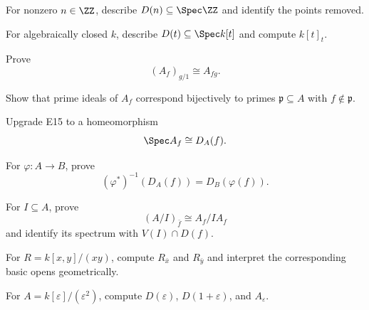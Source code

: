 \begin{exercise}
For nonzero $n\in\ZZ$, describe $D(n)\subseteq\Spec\ZZ$ and identify the points removed.
\end{exercise}

\begin{exercise}
For algebraically closed $k$, describe $D(t)\subseteq\Spec k[t]$ and compute $k[t]_t$.
\end{exercise}

\begin{exercise}
Prove
\[
(A_f)_{g/1}\cong A_{fg}.
\]
\end{exercise}

\begin{exercise}
Show that prime ideals of $A_f$ correspond bijectively to primes $\mathfrak p\subseteq A$
with $f\notin\mathfrak p$.
\end{exercise}

\begin{exercise}
Upgrade E15 to a homeomorphism
\[
\Spec A_f\cong D_A(f).
\]
\end{exercise}

\begin{exercise}
For $\varphi:A\to B$, prove
\[
(\varphi^\ast)^{-1}(D_A(f))=D_B(\varphi(f)).
\]
\end{exercise}

\begin{exercise}
For $I\subseteq A$, prove
\[
(A/I)_{\bar f}\cong A_f/IA_f
\]
and identify its spectrum with $V(I)\cap D(f)$.
\end{exercise}

\begin{exercise}
For $R=k[x,y]/(xy)$, compute $R_{\bar x}$ and $R_{\bar y}$ and interpret the corresponding
basic opens geometrically.
\end{exercise}

\begin{exercise}
For $A=k[\varepsilon]/(\varepsilon^2)$, compute $D(\varepsilon)$,
$D(1+\varepsilon)$, and $A_\varepsilon$.
\end{exercise}
